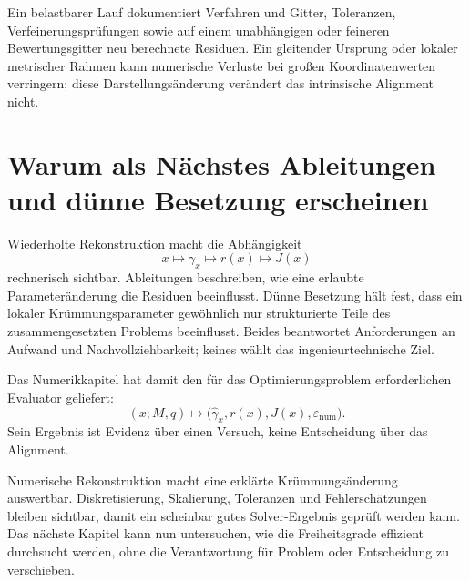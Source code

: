Ein belastbarer Lauf dokumentiert Verfahren und Gitter, Toleranzen,
Verfeinerungsprüfungen sowie auf einem unabhängigen oder feineren
Bewertungsgitter neu berechnete Residuen. Ein gleitender Ursprung oder lokaler
metrischer Rahmen kann numerische Verluste bei großen Koordinatenwerten
verringern; diese Darstellungsänderung verändert das intrinsische Alignment
nicht.

\section{Warum als Nächstes Ableitungen und dünne Besetzung erscheinen}

Wiederholte Rekonstruktion macht die Abhängigkeit
\[
x\longmapsto\gamma_x\longmapsto r(x)\longmapsto J(x)
\]
rechnerisch sichtbar. Ableitungen beschreiben, wie eine erlaubte
Parameteränderung die Residuen beeinflusst. Dünne Besetzung hält fest, dass
ein lokaler Krümmungsparameter gewöhnlich nur strukturierte Teile des
zusammengesetzten Problems beeinflusst. Beides beantwortet Anforderungen an
Aufwand und Nachvollziehbarkeit; keines wählt das ingenieurtechnische Ziel.

Das Numerikkapitel hat damit den für das Optimierungsproblem erforderlichen
Evaluator geliefert:
\[
(x;M,q)\longmapsto
\bigl(\widehat\gamma_x,r(x),J(x),\varepsilon_{\mathrm{num}}\bigr).
\]
Sein Ergebnis ist Evidenz über einen Versuch, keine Entscheidung über das
Alignment.

\begin{summary}
Numerische Rekonstruktion macht eine erklärte Krümmungsänderung auswertbar.
Diskretisierung, Skalierung, Toleranzen und Fehlerschätzungen bleiben sichtbar,
damit ein scheinbar gutes Solver-Ergebnis geprüft werden kann. Das nächste
Kapitel kann nun untersuchen, wie die Freiheitsgrade effizient durchsucht
werden, ohne die Verantwortung für Problem oder Entscheidung zu verschieben.
\end{summary}
